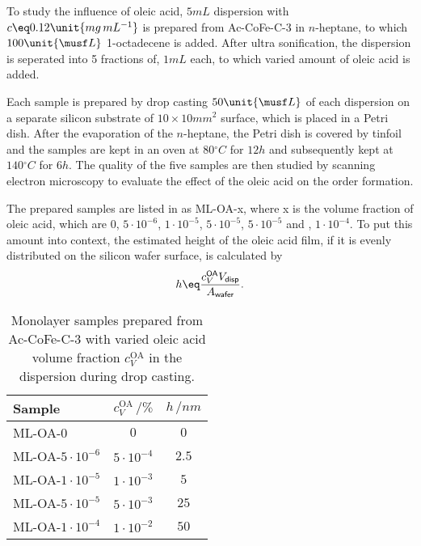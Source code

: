 \documentclass[\main/dresen_thesis.tex]{subfiles}
\begin{document}
      To study the influence of oleic acid, $5 \unit{mL}$ dispersion with $c \eq 0.12 \unit{mg \, mL^{-1}}$ is prepared from Ac-CoFe-C-3 in $\mathit{n}$-heptane, to which $100 \unit{\musf L}$ 1-octadecene is added.
      After ultra sonification, the dispersion is seperated into 5 fractions of, $1 \unit{mL}$ each, to which varied amount of oleic acid is added.

      Each sample is prepared by drop casting $50 \unit{\musf L}$ of each dispersion on a separate silicon substrate of $10 \times 10 \unit{mm^2}$ surface, which is placed in a Petri dish.
      After the evaporation of the $\mathit{n}$-heptane, the Petri dish is covered by tinfoil and the samples are kept in an oven at $80 \unit{^\circ C}$ for $\unit{12 \unit{h}}$ and subsequently kept at $140 \unit{^\circ C}$ for $\unit{6 \unit{h}}$.
      The quality of the five samples are then studied by scanning electron microscopy to evaluate the effect of the oleic acid on the order formation.

      The prepared samples are listed in  as ML-OA-x, where x is the volume fraction of oleic acid, which are $0$, $5 \cdot 10^{-6}$, $1 \cdot 10^{-5}$, $5 \cdot 10^{-5}$, $5 \cdot 10^{-5}$ and , $1 \cdot 10^{-4}$.
      To put this amount into context, the estimated height of the oleic acid film, if it is evenly distributed on the silicon wafer surface, is calculated by
      \begin{align}
        \label{eq:monolayers:preparation:solventVariation:OAAddend}
        h \eq \frac{c_V^\textsf{OA} V_\textsf{disp}}{A_\textsf{wafer}}.
      \end{align}

      \begin{table}[!htbp]
        \centering
        \caption{\label{tab:monolayers:charMethod:OAVariation}Monolayer samples prepared from Ac-CoFe-C-3 with varied oleic acid volume fraction $c_V^\mathrm{OA}$ in the dispersion during drop casting.}
        \begin{tabular}{ l | c | c}
          \textbf{Sample} & $c_V^\mathrm{OA} \, / \unit{\%}$ & $h \, / \unit{nm}$\\
          \hline
          ML-OA-$0$               & $0$                      & $0$\\
          ML-OA-$5 \cdot 10^{-6}$ & $5 \cdot 10^{-4}$        & $2.5$\\
          ML-OA-$1 \cdot 10^{-5}$ & $1 \cdot 10^{-3}$        & $5$\\
          ML-OA-$5 \cdot 10^{-5}$ & $5 \cdot 10^{-3}$        & $25$\\
          ML-OA-$1 \cdot 10^{-4}$ & $1 \cdot 10^{-2}$        & $50$\\
          \hline
        \end{tabular}
      \end{table}
\end{document}
